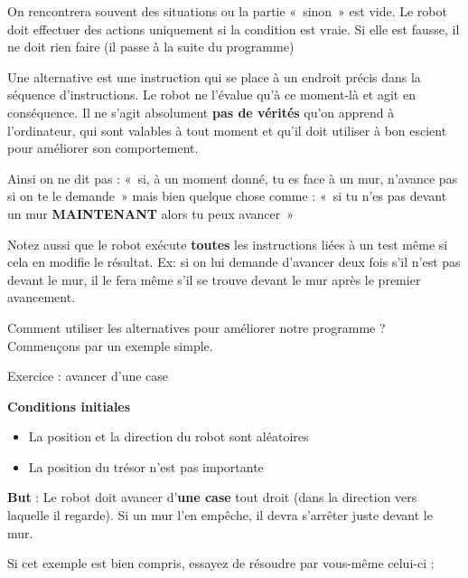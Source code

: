 	On rencontrera souvent des situations ou la partie «~sinon~» est vide.
	Le robot doit effectuer des actions uniquement si la condition est
	vraie. Si elle est fausse, il ne doit rien faire (il passe à la suite
	du programme)

	Une alternative est une instruction qui se place à un endroit précis
	dans la séquence d'instructions. Le robot ne
	l'évalue qu'à ce moment-là et agit en
	conséquence. Il ne s'agit absolument \textbf{pas de
	vérités} qu'on apprend à
	l'ordinateur, qui sont valables à tout moment et
	qu'il doit utiliser à bon escient pour améliorer son
	comportement.

	Ainsi on ne dit pas : «~si, à un moment donné, tu es face à un mur,
	n'avance pas si on te le demande~» mais bien quelque
	chose comme : «~si tu n'es pas devant un mur
	\textbf{MAINTENANT} alors tu peux avancer~»

	Notez aussi que le robot exécute \textbf{toutes} les instructions liées
	à un test même si cela en modifie le résultat. Ex: si on lui demande
	d'avancer deux fois s'il
	n'est pas devant le mur, il le fera même
	s'il se trouve devant le mur après le premier
	avancement.

	Comment utiliser les alternatives pour améliorer notre programme ?
	Commençons par un exemple simple.

	
	\begin{Emphase}[exercice]{Exercice : avancer d'une case}

		\textbf{Conditions initiales}

		\begin{itemize}
		\item La position et la direction du robot sont aléatoires
		\item La position du trésor n'est pas importante
		\end{itemize}
		
		\textbf{But} : Le robot doit avancer d'\textbf{une
		case} tout droit (dans la direction vers laquelle il regarde). 
		Si un mur l'en empêche, il devra s'arrêter juste devant le mur.

	\end{Emphase}

	
	Si cet exemple est bien compris, 
	essayez de résoudre par vous-même celui-ci :

